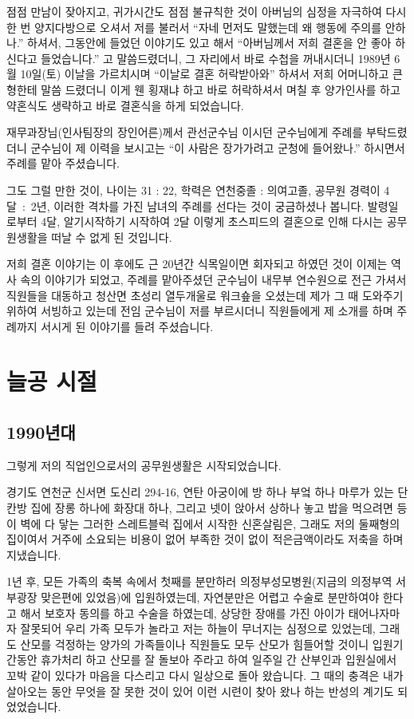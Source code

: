 \documentclass[chapter,book,openany,twoside]{oblivoir}
\begin{document}
점점 만남이 잦아지고, 귀가시간도 점점 불규칙한 것이 아버님의 심정을 자극하여 다시 한 번 양지다방으로 오셔서 저를 불러서 ``자네 먼저도 말했는데 왜 행동에 주의를 안하나.'' 하셔서, 그동안에 들었던 이야기도 있고 해서 ``아버님께서 저희 결혼을 안 좋아 하신다고 들었습니다.'' 고 말씀드렸더니, 그 자리에서 바로 수첩을 꺼내시더니 1989년 6월 10일(토) 이날을 가르치시며 ``이날로 결혼 허락받아와'' 하셔서 저희 어머니하고 큰형한테 말씀 드렸더니 이게 웬 횡재냐 하고 바로 허락하셔서 며칠 후 양가인사를 하고 약혼식도 생략하고 바로 결혼식을 하게 되었습니다.

 재무과장님(인사팀장의 장인어른)께서 관선군수님 이시던 군수님에게 주례를 부탁드렸더니 군수님이 제 이력을 보시고는 ``이 사람은 장가가려고 군청에 들어왔나.'' 하시면서 주례를 맡아 주셨습니다. 

그도 그럴 만한 것이, 나이는 31 : 22, 학력은 연천중졸 : 의여고졸, 공무원 경력이 \mbox{4달 : 2년}, 이러한 격차를 가진 남녀의 주례를 선다는 것이 궁금하셨나 봅니다.  발령일로부터 4달, 알기시작하기 시작하여 2달 이렇게 초스피드의 결혼으로 인해 다시는 공무원생활을 떠날 수 없게 된 것입니다.

저희 결혼 이야기는 이 후에도 근 20년간 식목일이면 회자되고 하였던 것이 이제는 역사 속의 이야기가 되었고, 주례를 맡아주셨던 군수님이 내무부 연수원으로 전근 가셔서 직원들을 대동하고 청산면 초성리 열두개울로 워크숖을 오셨는데 제가 그 때 도와주기 위하여 서빙하고 있는데 전임 군수님이 저를 부르시더니 직원들에게 제 소개를 하며 주례까지 서시게 된 이야기를 들려 주셨습니다.

\chapter{늘공 시절}
\section{1990년대}

그렇게 저의 직업인으로서의 공무원생활은 시작되었습니다.

경기도 연천군 신서면 도신리 294-16, 연탄 아궁이에 방 하나 부엌 하나 마루가 있는 단칸방 집에 장롱 하나에 화장대 하나, 그리고 넷이 앉아서 상하나 놓고 밥을 먹으려면 등이 벽에 다 닿는 그러한 스레트블럭 집에서 시작한 신혼살림은, 그래도 저의 둘째형의 집이여서 거주에 소요되는 비용이 없어 부족한 것이 없이 적은금액이라도 저축을 하며 지냈습니다.

1년 후, 모든 가족의 축복 속에서 첫째를 분만하러 의정부성모병원(지금의 의정부역 서부광장 맞은편에 있었음)에 입원하였는데, 자연분만은 어렵고 수술로 분만하여야 한다고 해서 보호자 동의를 하고 수술을 하였는데, 상당한 장애를 가진 아이가 태어나자마자 잘못되어 우리 가족 모두가 놀라고 저는 하늘이 무너지는 심정으로 있었는데, 그래도 산모를 걱정하는 양가의 가족들이나 직원들도 모두 산모가 힘들어할 것이니 입원기간동안 휴가처리 하고 산모를 잘 돌보아 주라고 하여 일주일 간 산부인과 입원실에서 꼬박 같이 있다가 마음을 다스리고 다시 일상으로 돌아 왔습니다. 그 때의 충격은 내가 살아오는 동안 무엇을 잘 못한 것이 있어 이런 시련이 찾아 왔나 하는 반성의 계기도 되었었습니다.
\end{document}
